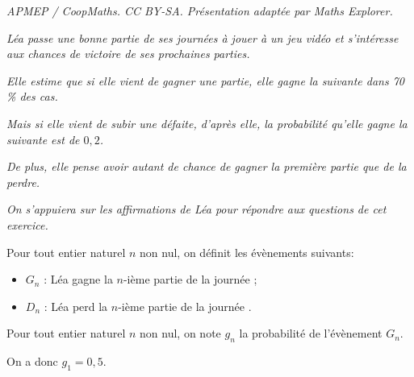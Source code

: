 \documentclass[10pt]{article}
\begin{document}
\noindent\textit{APMEP / CoopMaths. CC BY-SA. Présentation adaptée par Maths Explorer.}\par\medskip
\medskip

\emph{Léa passe une bonne partie de ses journées à jouer à un jeu vidéo et s'intéresse aux chances de victoire de ses prochaines parties.}

\medskip

\emph{Elle estime que si elle vient de gagner une partie, elle gagne la suivante dans 70\,\% des cas.}

\medskip

\emph{Mais si elle vient de subir une défaite, d'après elle, la probabilité qu'elle gagne la suivante est de $0,2$.}

\emph{De plus, elle pense avoir autant de chance de gagner la première partie que de la perdre.}

\emph{On s'appuiera sur les affirmations de Léa pour répondre aux questions de cet exercice.}

\medskip

Pour tout entier naturel $n$ non nul, on définit les évènements suivants: 

\begin{itemize}[label=$\bullet~$]
\item $G_n$ : \og Léa gagne la $n$-ième partie de la journée \fg{} ;
\item $D_n$ : \og Léa perd la $n$-ième partie de la journée \fg.
\end{itemize}

\smallskip

Pour tout entier naturel $n$ non nul, on note $g_n$ la probabilité de l'évènement $G_n$.

On a donc $g_1 = 0,5$.

\medskip
\end{document}
